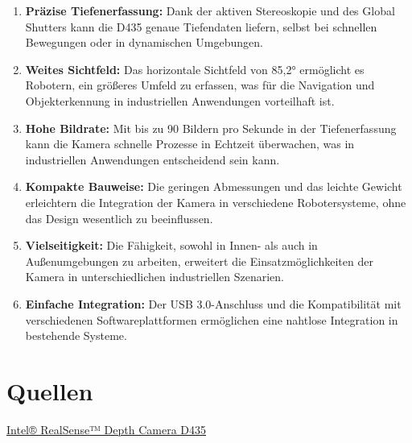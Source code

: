 \documentclass[a4paper,12pt]{article}
\begin{document}
\begin{enumerate}
    \item \textbf{Präzise Tiefenerfassung:} Dank der aktiven Stereoskopie und des Global Shutters kann 
    die D435 genaue Tiefendaten liefern, selbst bei schnellen Bewegungen oder in dynamischen Umgebungen.
    \item \textbf{Weites Sichtfeld:} Das horizontale Sichtfeld von 85,2° ermöglicht es Robotern, ein 
    größeres Umfeld zu erfassen, was für die Navigation und Objekterkennung in industriellen 
    Anwendungen vorteilhaft ist.
    \item \textbf{Hohe Bildrate:} Mit bis zu 90 Bildern pro Sekunde in der Tiefenerfassung kann die 
    Kamera schnelle Prozesse in Echtzeit überwachen, was in industriellen Anwendungen entscheidend sein kann.
    \item \textbf{Kompakte Bauweise:} Die geringen Abmessungen und das leichte Gewicht erleichtern 
    die Integration der Kamera in verschiedene Robotersysteme, ohne das Design wesentlich zu beeinflussen.
    \item \textbf{Vielseitigkeit:} Die Fähigkeit, sowohl in Innen- als auch in Außenumgebungen zu arbeiten, 
    erweitert die Einsatzmöglichkeiten der Kamera in unterschiedlichen industriellen Szenarien.
    \item \textbf{Einfache Integration:} Der USB 3.0-Anschluss und die Kompatibilität mit verschiedenen 
    Softwareplattformen ermöglichen eine nahtlose Integration in bestehende Systeme.
\end{enumerate}

\section*{Quellen}
\textcolor{blue}{\href{https://www.intelrealsense.com/depth-camera-d435/}{Intel® RealSense™ Depth Camera D435}}
\end{document}
